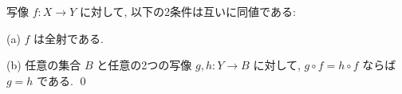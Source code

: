 \documentclass[12pt,twoside]{jarticle}
\newcommand\commentout[1]{#1}
\newcommand\commentout[1]{}
\begin{document}
\begin{question}[10点]
写像 $f \colon X \to Y$ に対して, 以下の2条件は互いに同値である:
\par\medskip\noindent
(a) $f$ は全射である.
\par\medskip\noindent
(b) 任意の集合 $B$ と任意の2つの写像 $g,h \colon Y \to B$ に対して,
$g \circ f = h \circ f$ ならば $g = h$ である.
\qed
\end{question}


%
%
%
%
%

%
% 
%
%
\allowdisplaybreaks
%
%
%
%
\end{document}
